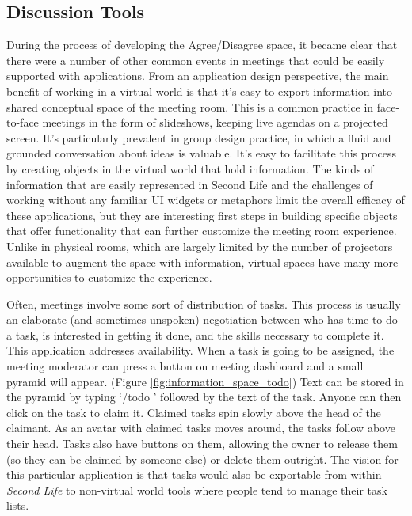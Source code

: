 \subsection{Discussion Tools}

During the process of developing the Agree/Disagree space, it became clear that there were a number of other common events in meetings that could be easily supported with applications. From an application design perspective, the main benefit of working in a virtual world is that it's easy to export information into shared conceptual space of the meeting room. This is a common practice in face-to-face meetings in the form of slideshows, keeping live agendas on a projected screen. It's particularly prevalent in group design practice, in which a fluid and grounded conversation about ideas is valuable. \citep{Dwyer:2005uj} It's easy to facilitate this process by creating objects in the virtual world that hold information. The kinds of information that are easily represented in Second Life and the challenges of working without any familiar UI widgets or metaphors limit the overall efficacy of these applications, but they are interesting first steps in building specific objects that offer functionality that can further customize the meeting room experience. Unlike in physical rooms, which are largely limited by the number of projectors available to augment the space with information, virtual spaces have many more opportunities to customize the experience.

Often, meetings involve some sort of distribution of tasks. This process is usually an elaborate (and sometimes unspoken) negotiation between who has time to do a task, is interested in getting it done, and the skills necessary to complete it. This application addresses availability. When a task is going to be assigned, the meeting moderator can press a button on meeting dashboard and a small pyramid will appear. (Figure \ref{fig:information_space_todo}) Text can be stored in the pyramid by typing `/todo ' followed by the text of the task. Anyone can then click on the task to claim it. Claimed tasks spin slowly above the head of the claimant. As an avatar with claimed tasks moves around, the tasks follow above their head. Tasks also have buttons on them, allowing the owner to release them (so they can be claimed by someone else) or delete them outright. The vision for this particular application is that tasks would also be exportable from within \emph{Second Life} to non-virtual world tools where people tend to manage their task lists.

